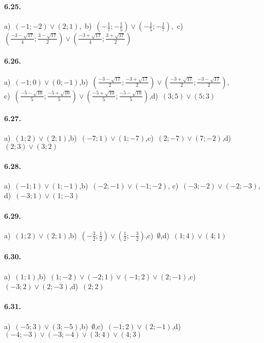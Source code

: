 \paragraph{6.25.} a)~\( (-1; -2)\vee(2;1) \),\, b)~\(\left(-\frac 1 7;-\frac 1 5\right)\vee\left(-\frac 1 5;-\frac 1 7\right)\),\, c)~\(\left(\frac{-3-\sqrt{17}} 4;{\frac{3-\sqrt{17}} 2}\right)\vee \left(\frac{-3+\sqrt{17}} 4;{\frac{3+\sqrt{17}} 2}\right)\)

\paragraph{6.26.} a)~\((-1;0)\vee(0;-1)\),\quad b)~\(\left(\frac{-3-\sqrt{17}} 2;\frac{-3+\sqrt{17}} 2\right)\vee\left(\frac{-3+\sqrt{17}} 2;\frac{-3-\sqrt{17}} 2\right)\),\protect\\
\quad c)~\(\left(\frac{-5-\sqrt{10}} 5;\frac{-5+\sqrt{10}} 5\right)\vee \left(\frac{-5+\sqrt{10}} 5;\frac{-5-\sqrt{10}} 5\right)\),\quad d)~\((3;5)\vee(5;3)\)

\paragraph{6.27.} a)~\((1;2)\vee(2;1)\),\quad b)~\((-7;1)\vee(1;-7)\),\quad c)~\((2;-7)\vee(7;-2)\),\quad d)~\((2;3)\vee(3;2)\)

\paragraph{6.28.} a)~\((-1;1)\vee(1;-1)\),\;b)~\((-2;-1)\vee(-1;-2)\),\; c)~\((-3;-2)\vee(-2;-3)\),\; d)~\((-3;1)\vee(1;-3)\)

\paragraph{6.29.} a)~\((1;2)\vee(2;1)\),\quad b)~\(\left(-\frac 3 2;\frac 1 2\right)\vee\left(\frac 1 2;-\frac 3 2\right)\),\quad c)~\(\emptyset\),\quad d)~\((1;4)\vee(4;1)\)

\paragraph{6.30.} a)~\((1;1)\),\quad b)~\((1;-2)\vee(-2;1)\vee(-1;2)\vee(2;-1)\),\quad c)~\((-3;2)\vee(2;-3)\),\quad d)~\((2;2)\)

\paragraph{6.31.} a)~\((-5;3)\vee(3;-5)\),\quad b)~\(\emptyset\),\quad c)~\((-1;2)\vee(2;-1)\),\quad d)~\((-4;-3)\vee(-3;-4)\vee(3;4)\vee(4;3)\)

